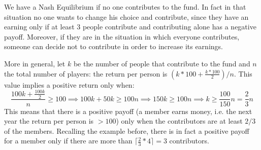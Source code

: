 \documentclass{article}
\begin{document}
We have a Nash Equilibrium if no one contributes to the fund. In fact in that situation no one wants to change his choice and contribute, since they have an earning only if at least 3 people contribute and contributing alone has a negative payoff. Moreover, if they are in the situation in which everyone contributes, someone can decide not to contribute in order to increase its earnings.

More in general, let $k$ be the number of people that contribute to the fund and $n$ the total number of players: the return per person is $(k*100+\frac{k*100}{2})/n$. This value implies a positive return only when: $$ \frac{100k+\frac{100k}{2}}{n} \geq 100 \implies 100k+50k \geq 100n \implies 150k \geq 100n \implies k \geq \frac{100}{150}n = \frac{2}{3}n$$
This means that there is a positive payoff (a member earns money, i.e. the next year the return per person is $>100$) only when the contributors are at least $2/3$ of the members. Recalling the example before, there is in fact a positive payoff for a member only if there are more than $\lceil \frac{2}{3}*4 \rceil = 3$ contributors.
\end{document}
